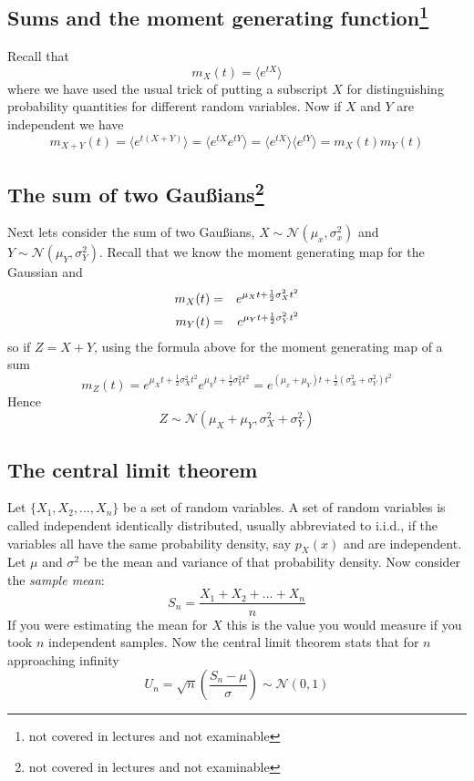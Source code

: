 \documentclass[11pt,a4paper]{scrartcl}
\begin{document}
\subsection*{Sums and the moment generating function\footnote{not covered in lectures and not examinable}}
Recall that
\begin{equation}
m_X(t)=\langle e^{tX}\rangle
\end{equation}
where we have used the usual trick of putting a subscript $X$ for
distinguishing probability quantities for different random variables. Now if $X$ and $Y$ are independent we have
\begin{equation}
m_{X+Y}(t)=\langle e^{t(X+Y)}\rangle=\langle e^{tX}e^{tY}\rangle=\langle e^{tX}\rangle \langle e^{tY}\rangle=m_X(t)m_Y(t)
\end{equation}

\subsection*{The sum of two Gau\ss{}ians\footnote{not covered in lectures and not examinable}}

Next lets consider the sum of two Gau\ss{}ians, $X\sim
\mathcal{N}(\mu_x,\sigma_x^2)$ and $Y\sim
\mathcal{N}(\mu_Y,\sigma_Y^2)$. Recall that we know the moment generating map for the Gaussian and
\begin{eqnarray}
m_X(t)&=&e^{\mu_X t+\frac{1}{2}\sigma_X^2t^2}\cr
m_Y(t)&=&e^{\mu_Y t+\frac{1}{2}\sigma_Y^2t^2}
\end{eqnarray}
so if $Z=X+Y$, using the formula above for the moment generating map
of a sum
\begin{equation}
m_Z(t)=e^{\mu_X t+\frac{1}{2}\sigma_X^2t^2}e^{\mu_Y t+\frac{1}{2}\sigma_Y^2t^2}
=e^{(\mu_x+\mu_Y)t+\frac{1}{2}(\sigma_X^2+\sigma_Y^2)t^2}
\end{equation}
Hence
\begin{equation}
Z\sim \mathcal{N}(\mu_X+\mu_Y,\sigma_X^2+\sigma_Y^2)
\end{equation}

\subsection*{The central limit theorem}

Let $\{X_1,X_2,\ldots,X_n\}$ be a set of random variables. A set of
random variables is called independent identically distributed,
usually abbreviated to i.i.d., if the variables all have the same
probability density, say $p_X(x)$ and are independent. Let $\mu$ and
$\sigma^2$ be the mean and variance of that probability density. Now
consider the \textsl{sample mean}:
\begin{equation}
S_n=\frac{X_1+X_2+\ldots+X_n}{n}
\end{equation}
If you were estimating the mean for $X$ this is the value you would
measure if you took $n$ independent samples. Now the central limit
theorem stats that for $n$ approaching infinity
\begin{equation}
U_n=\sqrt{n}\left(\frac{S_n-\mu}{\sigma}\right) \sim \mathcal{N}(0,1)
\end{equation}
\end{document}

